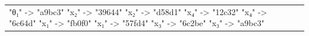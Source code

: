 \documentclass{beamer}
\begin{document}
\begin{frame}[fragile]
\begin{table}[H]
\begin{tabular}{lll}
\begin{adjustbox}{minipage={.4\textwidth}, height=0.22\textwidth, margin*=0cm 0cm 0cm 0.1cm}
{                          "θ₁" -> "a9bc3"
                          "x₂" -> "39644"
                          "x₂" -> "d58d1"
                          "x₄" -> "12c32"
                          "x₄" -> "6c64d"
                          "x₁" -> "fb0f0"
                          "x₁" -> "57fd4"
                          "x₃" -> "6c2be"
                          "x₃" -> "a9bc3"
                      } \end{adjustbox}
            \end{tabular}
        \end{table}
    \end{frame}

%
\end{document}
